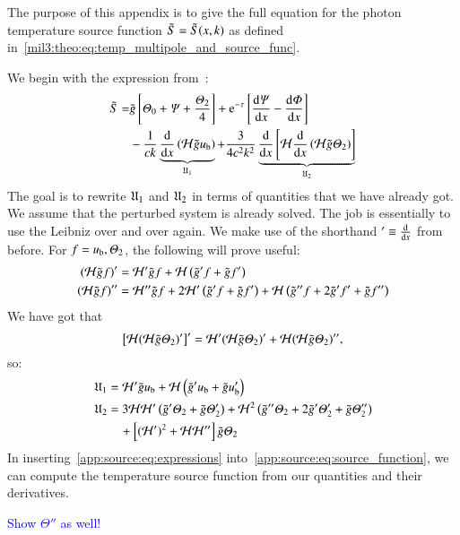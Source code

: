 

The purpose of this appendix is to give the full equation for the photon temperature source function $\tilde{S}=\tilde{S}(x, k)$ as defined in~\cref{mil3:theo:eq:temp_multipole_and_source_func}.

We begin with the expression from~\citet[Eq.~(40)]{Callin2006}:
\begin{equation}\label{app:source:eq:source_function}
\begin{split}
    \tilde{S} =& \gt \left[\Theta_0 + \Psi + \frac{\Theta_2}{4}\right] + \eu[-\tau]\left[ \dv{\Psi}{x} -\dv{\Phi}{x} \right] \\
    &- \frac{1}{ck} \underbrace{\dv{}{x}\left(\Hp \gt u\ped{b} \right)}_{\expr_1}+ \frac{3}{4c^2k^2} \underbrace{\dv{}{x}\left[ \Hp \dv{}{x}\left(\Hp \gt\Theta_2 \right)  \right]}_{\expr_2}
\end{split}
\end{equation}
The goal is to rewrite $\mathfrak{U}_1$ and $\mathfrak{U}_2$ in terms of quantities that we have already got. We assume that the perturbed system is already solved. The job is essentially to use the Leibniz over and over again. We make use of the shorthand $'\equiv \dv{}{x}$ from before. For $f=u_\mathrm{b}, \varTheta_2 $, the following will prove useful:
\begin{subequations}
\begin{align}
    \left(\mathcal{H} \tilde{g} f \right)' &= \mathcal{H}'\tilde{g} f + \mathcal{H} \left( \tilde{g}' f + \tilde{g} f'\right)\\
    \left(\mathcal{H} \tilde{g} f \right)''&= \mathcal{H}'' \tilde{g} f + 2\mathcal{H}' \left(\tilde{g}' f + \tilde{g} f'\right) + \mathcal{H} \left(\tilde{g}'' f + 2\tilde{g}' f' + \tilde{g} f'' \right)
\end{align}
\end{subequations}
We have got that 
\begin{equation}
    \left[\mathcal{H} (\mathcal{H} \tilde{g} \varTheta_2)' \right]' = \mathcal{H}' (\mathcal{H} \tilde{g} \varTheta_2)' + \mathcal{H} (\mathcal{H} \tilde{g} \varTheta_2)'',
\end{equation}
so:
\begin{subequations}\label{app:source:eq:expressions}
\begin{align}
    \mathfrak{U}_1 &= \mathcal{H}'\tilde{g} u_\mathrm{b} + \mathcal{H} \left( \tilde{g}' u_\mathrm{b} + \tilde{g} u_\mathrm{b}'\right) \\
    \mathfrak{U}_2 &= 3\mathcal{H} \mathcal{H}' \left(\tilde{g}' \varTheta_2 + \tilde{g} \varTheta_2'\right) + \mathcal{H}^2\left(\tilde{g}'' \varTheta_2 +2 \tilde{g}' \varTheta_2' + \tilde{g} \varTheta_2''\right) \nonumber \\
    & \quad + \left[(\mathcal{H}')^2 + \mathcal{H} \mathcal{H}''\right]\tilde{g} \varTheta_2
\end{align}
\end{subequations}
In inserting~\cref{app:source:eq:expressions} into~\cref{app:source:eq:source_function}, we can compute the temperature source function from our quantities and their derivatives. 

\textcolor{blue}{Show $\Theta''$ as well!}



    
